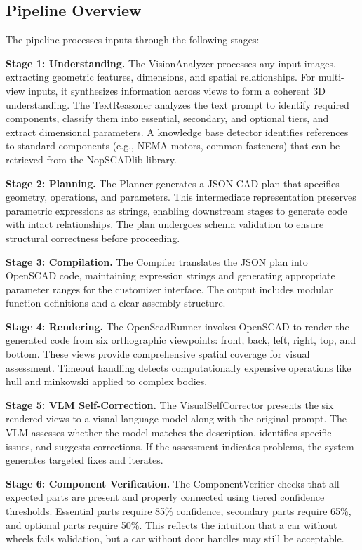 \documentclass[5p,twocolumn,10pt,times]{elsarticle}
\begin{document}
\subsection{Pipeline Overview}

The pipeline processes inputs through the following stages:

\textbf{Stage 1: Understanding.} The VisionAnalyzer processes any input images, extracting geometric features, dimensions, and spatial relationships. For multi-view inputs, it synthesizes information across views to form a coherent 3D understanding. The TextReasoner analyzes the text prompt to identify required components, classify them into essential, secondary, and optional tiers, and extract dimensional parameters. A knowledge base detector identifies references to standard components (e.g., NEMA motors, common fasteners) that can be retrieved from the NopSCADlib library.

\textbf{Stage 2: Planning.} The Planner generates a JSON CAD plan that specifies geometry, operations, and parameters. This intermediate representation preserves parametric expressions as strings, enabling downstream stages to generate code with intact relationships. The plan undergoes schema validation to ensure structural correctness before proceeding.

\textbf{Stage 3: Compilation.} The Compiler translates the JSON plan into OpenSCAD code, maintaining expression strings and generating appropriate parameter ranges for the customizer interface. The output includes modular function definitions and a clear assembly structure.

\textbf{Stage 4: Rendering.} The OpenScadRunner invokes OpenSCAD to render the generated code from six orthographic viewpoints: front, back, left, right, top, and bottom. These views provide comprehensive spatial coverage for visual assessment. Timeout handling detects computationally expensive operations like hull and minkowski applied to complex bodies.

\textbf{Stage 5: VLM Self-Correction.} The VisualSelfCorrector presents the six rendered views to a visual language model along with the original prompt. The VLM assesses whether the model matches the description, identifies specific issues, and suggests corrections. If the assessment indicates problems, the system generates targeted fixes and iterates.

\textbf{Stage 6: Component Verification.} The ComponentVerifier checks that all expected parts are present and properly connected using tiered confidence thresholds. Essential parts require 85\% confidence, secondary parts require 65\%, and optional parts require 50\%. This reflects the intuition that a car without wheels fails validation, but a car without door handles may still be acceptable.
\end{document}
